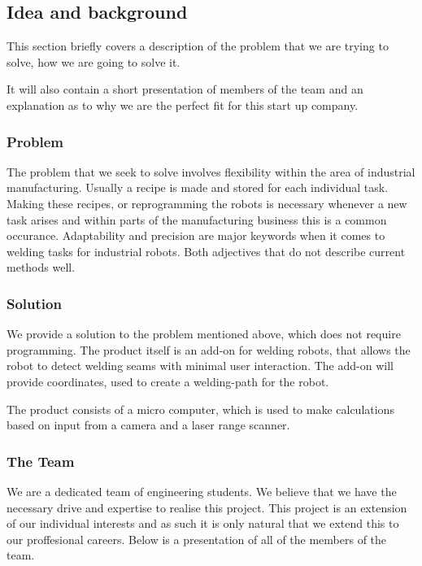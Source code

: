 \subsection{Idea and background}
This section briefly covers a description of the problem that we are trying to solve, how we are going to solve it.

It will also contain a short presentation of members of the team and an explanation as to why we are the perfect fit for this start up company.

\subsubsection{Problem}
The problem that we seek to solve involves flexibility within the area of industrial manufacturing. Usually a recipe is made and stored for each individual task.
Making these recipes, or reprogramming the robots is necessary whenever a new task arises and within parts of the manufacturing business this is a common occurance. 
Adaptability and precision are major keywords when it comes to welding tasks for industrial robots. Both adjectives that do not describe current methods well.

\subsubsection{Solution}
We provide a solution to the problem mentioned above, which does not require programming. The product itself is an add-on for welding robots, that allows the robot to detect welding seams with minimal user interaction. The add-on will provide coordinates, used to create a welding-path for the robot. 

The product consists of a micro computer, which is used to make calculations based on input from a camera and a laser range scanner. 

\subsubsection{The Team}
We are a dedicated team of engineering students. We believe that we have the necessary drive and expertise to realise this project. This project is an extension of our individual interests and as such it is only natural that we extend this to our proffesional careers. Below is a presentation of all of the members of the team.

